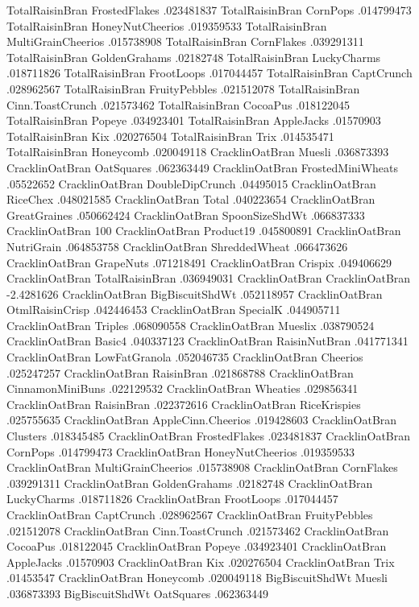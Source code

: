 TotalRaisinBran	FrostedFlakes	.023481837
TotalRaisinBran	CornPops	.014799473
TotalRaisinBran	HoneyNutCheerios	.019359533
TotalRaisinBran	MultiGrainCheerios	.015738908
TotalRaisinBran	CornFlakes	.039291311
TotalRaisinBran	GoldenGrahams	.02182748
TotalRaisinBran	LuckyCharms	.018711826
TotalRaisinBran	FrootLoops	.017044457
TotalRaisinBran	CaptCrunch	.028962567
TotalRaisinBran	FruityPebbles	.021512078
TotalRaisinBran	Cinn.ToastCrunch	.021573462
TotalRaisinBran	CocoaPus	.018122045
TotalRaisinBran	Popeye	.034923401
TotalRaisinBran	AppleJacks	.01570903
TotalRaisinBran	Kix	.020276504
TotalRaisinBran	Trix	.014535471
TotalRaisinBran	Honeycomb	.020049118
CracklinOatBran	Muesli	.036873393
CracklinOatBran	OatSquares	.062363449
CracklinOatBran	FrostedMiniWheats	.05522652
CracklinOatBran	DoubleDipCrunch	.04495015
CracklinOatBran	RiceChex	.048021585
CracklinOatBran	Total	.040223654
CracklinOatBran	GreatGraines	.050662424
CracklinOatBran	SpoonSizeShdWt	.066837333
CracklinOatBran	100%
CracklinOatBran	Product19	.045800891
CracklinOatBran	NutriGrain	.064853758
CracklinOatBran	ShreddedWheat	.066473626
CracklinOatBran	GrapeNuts	.071218491
CracklinOatBran	Crispix	.049406629
CracklinOatBran	TotalRaisinBran	.036949031
CracklinOatBran	CracklinOatBran	-2.4281626
CracklinOatBran	BigBiscuitShdWt	.052118957
CracklinOatBran	OtmlRaisinCrisp	.042446453
CracklinOatBran	SpecialK	.044905711
CracklinOatBran	Triples	.068090558
CracklinOatBran	Mueslix	.038790524
CracklinOatBran	Basic4	.040337123
CracklinOatBran	RaisinNutBran	.041771341
CracklinOatBran	LowFatGranola	.052046735
CracklinOatBran	Cheerios	.025247257
CracklinOatBran	RaisinBran	.021868788
CracklinOatBran	CinnamonMiniBuns	.022129532
CracklinOatBran	Wheaties	.029856341
CracklinOatBran	RaisinBran	.022372616
CracklinOatBran	RiceKrispies	.025755635
CracklinOatBran	AppleCinn.Cheerios	.019428603
CracklinOatBran	Clusters	.018345485
CracklinOatBran	FrostedFlakes	.023481837
CracklinOatBran	CornPops	.014799473
CracklinOatBran	HoneyNutCheerios	.019359533
CracklinOatBran	MultiGrainCheerios	.015738908
CracklinOatBran	CornFlakes	.039291311
CracklinOatBran	GoldenGrahams	.02182748
CracklinOatBran	LuckyCharms	.018711826
CracklinOatBran	FrootLoops	.017044457
CracklinOatBran	CaptCrunch	.028962567
CracklinOatBran	FruityPebbles	.021512078
CracklinOatBran	Cinn.ToastCrunch	.021573462
CracklinOatBran	CocoaPus	.018122045
CracklinOatBran	Popeye	.034923401
CracklinOatBran	AppleJacks	.01570903
CracklinOatBran	Kix	.020276504
CracklinOatBran	Trix	.01453547
CracklinOatBran	Honeycomb	.020049118
BigBiscuitShdWt	Muesli	.036873393
BigBiscuitShdWt	OatSquares	.062363449
